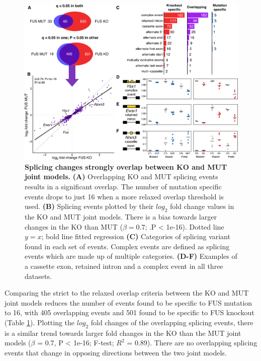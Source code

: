 \begin{figure}[t]
	\centering
	\includegraphics[width=\textwidth]{Figures/06_fus_meta/splicing_multi.png}
	\caption[Splicing changes  strongly overlap between KO and MUT joint models]{
			\textbf{Splicing changes  strongly overlap between KO and MUT joint models.}
			\textbf{(A)} Overlapping KO and MUT splicing events results in a significant overlap. The number of mutation specific events drops to just 16 when a more relaxed overlap threshold is used.
			\textbf{(B)} Splicing events plotted by their $log_2$ fold change values in the KO and MUT joint models. There is a bias towards larger changes in the KO than MUT ($\beta = 0.7$; .P < 1e-16). Dotted line $y=x$; bold line fitted regression
			\textbf{(C)} Categories of splicing variant found in each set of events. Complex events are defined as splicing events which are made up of multiple categories.
			\textbf{(D-F)} Examples of a cassette exon, retained intron and a complex event in all three datasets. 
	}
	\label{fig:fus_splicing_multi}
\end{figure}

Comparing the strict to the relaxed overlap criteria between the KO and MUT joint models reduces the number of events found to be specific to FUS mutation to 16, with 405 overlapping events and 501 found to be specific to FUS knockout (Table \ref{fig:fus_splicing_multi}). 
Plotting the $log_2$ fold changes of the overlapping splicing events, there is a similar trend towards larger fold changes in the KO than the MUT joint models ($\beta$ = 0.7, P < 1e-16; F-test; $R^2$ = 0.89). 
There are no overlapping splicing events that change in opposing directions between the two joint models.

